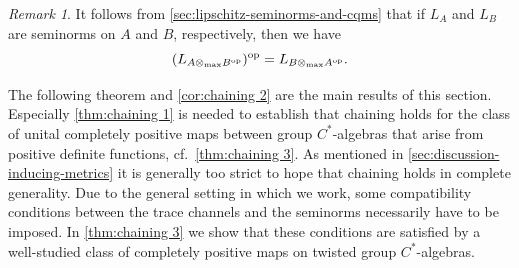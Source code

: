 \documentclass[11pt, a4paper, oneside, final, reqno]{amsart}
\theoremstyle{definition}
\theoremstyle{plain}
\theoremstyle{remark}
\newtheorem{remark}[definition]{Remark}
\numberwithin{equation}{section}
\begin{document}
\begin{remark}\label{rem:sLip-norms and adjoints}
    It follows from \cref{sec:lipschitz-seminorms-and-cqms} that if $L_A$ and $L_B$ are seminorms on $A$ and $B$, respectively, then we have
    \begin{equation}\label{eqn:swap of tensor seminorms}
        (L_{A \otimes_{\rm max} B^{\rm op}})^{\rm op} = L_{B \otimes_{\rm max} A^{\rm op}}.
    \end{equation}
\end{remark}

The following theorem and \cref{cor:chaining 2} are the main results of this section. Especially \cref{thm:chaining 1} is needed to establish that chaining holds for the class of unital completely positive maps between group $C^*$-algebras that arise from positive definite functions, cf.~\cref{thm:chaining 3}. As mentioned in \cref{sec:discussion-inducing-metrics} it is generally too strict to hope that chaining holds in complete generality. Due to the general setting in which we work, some compatibility conditions between the trace channels and the seminorms necessarily have to be imposed. In \cref{thm:chaining 3} we show that these conditions are satisfied by a well-studied class of completely positive maps on twisted group $C^*$-algebras.
\end{document}
